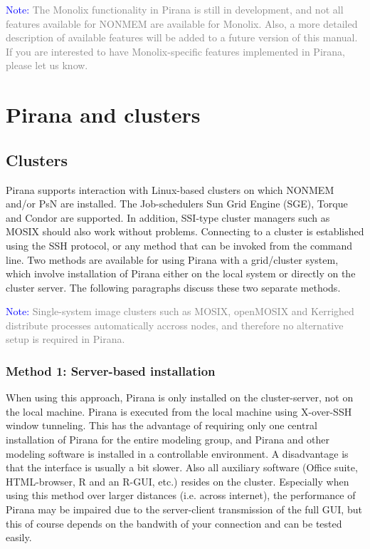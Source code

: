 {{{{\vspace{10pt}
\noindent\scriptsize \textcolor{Blue}{Note:} \textcolor{Grey} {
The Monolix functionality in Pirana is still in development, and not all features available for NONMEM are available for Monolix. Also, a more detailed description of available features will be added to a future version of this manual.
If you are interested to have Monolix-specific features implemented in Pirana, please let us know.}
\normalsize

\chapter{Pirana and clusters}

\section{Clusters} Pirana supports interaction with Linux-based
clusters on which NONMEM and/or PsN are installed. The Job-schedulers
Sun Grid Engine (SGE), Torque and Condor are supported. In addition,
SSI-type cluster managers such as MOSIX should also work without
problems. Connecting to a cluster is established using the SSH
protocol, or any method that can be invoked from the command line. Two
methods are available for using Pirana with a grid/cluster system,
which involve installation of Pirana either on the local system or
directly on the cluster server. The following paragraphs discuss these
two separate methods.

\vspace{10pt}
\noindent\scriptsize \textcolor{Blue}{Note:} \textcolor{Grey} {Single-system image clusters such as MOSIX, openMOSIX and
Kerrighed distribute processes automatically accross nodes, and therefore no alternative setup is required in Pirana.}
\normalsize

\subsection{Method 1: Server-based installation}
When using this approach, Pirana is only installed on the
cluster-server, not on the local machine. Pirana is executed from the
local machine using X-over-SSH window tunneling. This has the
advantage of requiring only one central installation of Pirana for the
entire modeling group, and Pirana and other modeling software is
installed in a controllable environment. A disadvantage is that the
interface is usually a bit slower. Also all auxiliary software (Office
suite, HTML-browser, R and an R-GUI, etc.) resides on the
cluster. Especially when using this method over larger distances
(i.e. across internet), the performance of Pirana may be impaired due
to the server-client transmission of the full GUI, but this of course
depends on the bandwith of your connection and can be tested easily.\\

}}}}
